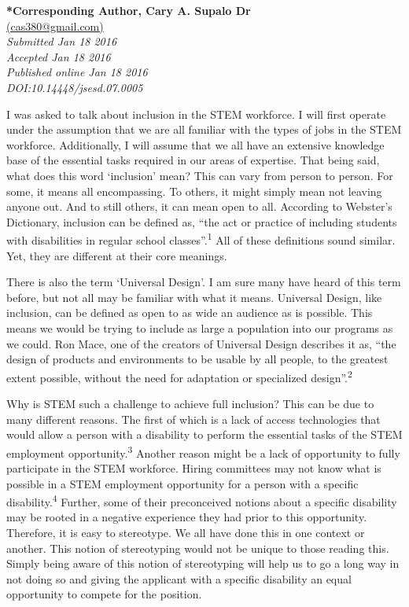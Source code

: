 \documentclass[11.5pt]{sig-alternate} %
\begin{document}
\textbf{*Corresponding Author, Cary A. Supalo Dr}\\
\href{mailto: cas380@gmail.com}{(cas380@gmail.com)} \\
\textit{Submitted Jan 18 2016}\\
\textit{Accepted Jan 18 2016} \\
\textit{Published online Jan 18 2016} \\
\textit{DOI:10.14448/jsesd.07.0005} \\
\pagebreak
\clearpage
\begin{large}
I was asked to talk about inclusion in the STEM workforce. I will first operate under the assumption that we are all familiar with the types of jobs in the STEM workforce. Additionally, I will assume that we all have an extensive knowledge base of the essential tasks required in our areas of expertise.  That being said, what does this word ‘inclusion’ mean? This can vary from person to person. For some, it means all encompassing. To others, it might simply mean not leaving anyone out. And to still others, it can mean open to all. According to Webster’s Dictionary, inclusion can be defined as, “the act or practice of including students with disabilities in regular school classes”.\textsuperscript{1}  All of these definitions sound similar. Yet, they are different at their core meanings.

There is also the term ‘Universal Design’. I am sure many have heard of this term before, but not all may be familiar with what it means. Universal Design, like inclusion, can be defined as open to as wide an audience as is possible. This means we would be trying to include as large a population into our programs as we could. Ron Mace, one of the creators of Universal Design describes it as, “the design of products and environments to be usable by all people, to the greatest extent possible, without the need for adaptation or specialized design”.\textsuperscript{2}

Why is STEM such a challenge to achieve full inclusion? This can be due to many different reasons. The first of which is a lack of access technologies that would allow a person with a disability to perform the essential tasks of the STEM employment opportunity.\textsuperscript{3}  Another reason might be a lack of opportunity to fully participate in the STEM workforce. Hiring committees may not know what is possible in a STEM employment opportunity for a person with a specific disability.\textsuperscript{4} Further, some of their preconceived notions about a specific disability may be rooted in a negative experience they had prior to this opportunity. Therefore, it is easy to stereotype. We all have done this in one context or another. This notion of stereotyping would not be unique to those reading this. Simply being aware of this notion of stereotyping will help us to go a long way in not doing so and giving the applicant with a specific disability an equal opportunity to compete for the position.


\end{large}
\end{document}
